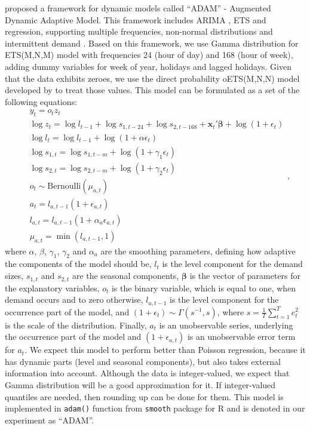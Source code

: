 \documentclass[]{elsarticle} %
\begin{document}
\citet{SvetunkovAdam2021} proposed a framework for dynamic models called ``ADAM'' - Augmented Dynamic Adaptive Model. This framework includes ARIMA \citep{Box1976}, ETS \citep{Hyndman2008b} and regression, supporting multiple frequencies, non-normal distributions and intermittent demand \citep{Svetunkov2019a}. Based on this framework, we use Gamma distribution for ETS(M,N,M) model with frequencies 24 (hour of day) and 168 (hour of week), adding dummy variables for week of year, holidays and lagged holidays. Given that the data exhibits zeroes, we use the direct probability oETS(M,N,N) model developed by \citet{Svetunkov2019a} to treat those values. This model can be formulated as a set of the following equations:
\begin{equation}
    \begin{aligned}
      & y_t = o_t z_t \\
        & \log z_t = \log l_{t-1} + \log s_{1,t-24} + \log s_{2,t-168} + \mathbf{x}_t' \boldsymbol{\beta} + \log \left(1 + \epsilon_{t} \right) \\
        & \log l_{t} = \log l_{t-1} + \log( 1  + \alpha \epsilon_{t}) \\ 
        & \log s_{1,t} = \log s_{1,t-m} + \log( 1  + \gamma_1 \epsilon_{t}) \\
        & \log s_{2,t} = \log s_{2,t-m} + \log( 1  + \gamma_2 \epsilon_{t}) \\
        & o_t \sim \text{Bernoulli} \left(\mu_{a,t} \right) \\
        & a_t = l_{a,t-1} \left(1 + \epsilon_{a,t} \right) \\
        & l_{a,t} = l_{a,t-1}( 1  + \alpha_{a} \epsilon_{a,t}) \\
        & \mu_{a,t} = \min(l_{a,t-1}, 1)
    \end{aligned} ,
    \label{eq:ADAMModel}
\end{equation}
where \(\alpha\), \(\beta\), \(\gamma_1\), \(\gamma_2\) and \(\alpha_a\) are the smoothing parameters, defining how adaptive the components of the model should be, \(l_t\) is the level component for the demand sizes, \(s_{1,t}\) and \(s_{2,t}\) are the seasonal components, \(\boldsymbol{\beta}\) is the vector of parameters for the explanatory variables, \(o_t\) is the binary variable, which is equal to one, when demand occurs and to zero otherwise, \(l_{a,t-1}\) is the level component for the occurrence part of the model, and \(\left(1+\epsilon_t \right) \sim \mathcal{\Gamma}(s^{-1}, s)\), where \(s=\frac{1}{T} \sum_{t=1}^{T} e_{t}^2\) is the scale of the distribution. Finally, \(a_t\) is an unobservable series, underlying the occurrence part of the model and \((1 + \epsilon_{a,t})\) is an unobservable error term for \(a_t\). We expect this model to perform better than Poisson regression, because it has dynamic parts (level and seasonal components), but also takes external information into account. Although the data is integer-valued, we expect that Gamma distribution will be a good approximation for it. If integer-valued quantiles are needed, then rounding up can be done for them. This model is implemented in \texttt{adam()} function from \texttt{smooth} package \citep{Svetunkov2021Smooth} for R and is denoted in our experiment as ``ADAM''.
\end{document}
